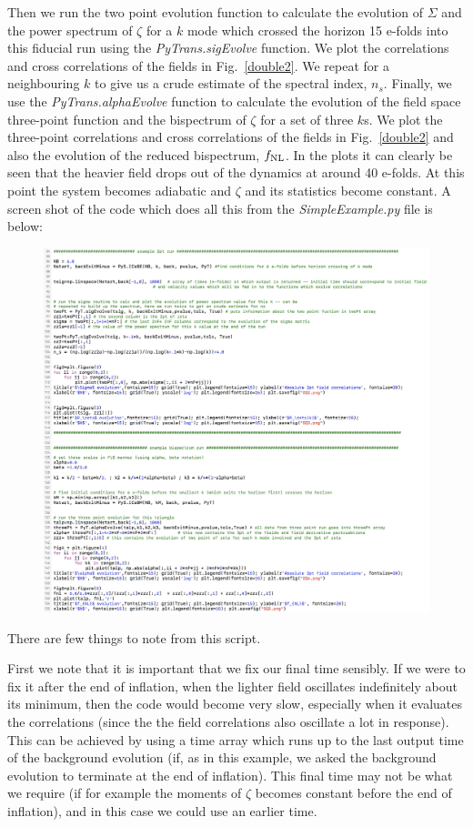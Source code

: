 \documentclass[10pt,
amsmath,amssymb,
aps,prd,nofootinbib,eqsecnum,a4paper]{revtex4}
\begin{document}
Then we run the two point evolution function to calculate the evolution 
of $\Sigma$ and the power spectrum of $\zeta$ for a $k$ mode which crossed the horizon 
15 e-folds into this fiducial run using the {\it PyTrans.sigEvolve} function. 
We plot the correlations and cross correlations of the fields in Fig.~\ref{double2}. 
We repeat for a neighbouring $k$ to give us a crude estimate of the spectral index,  $n_s$. 
Finally, we use the {\it PyTrans.alphaEvolve} function to calculate the evolution of the field space three-point function 
  and the bispectrum of $\zeta$  for a set of three $k$s.
We plot the three-point correlations and cross correlations of the fields in Fig.~\ref{double2} and also 
the evolution of the reduced 
bispectrum, $f_{\rm NL}$. In the plots it can clearly be 
seen that the heavier field drops out of the dynamics at around 40 e-folds. At this 
point the system becomes adiabatic and $\zeta$ and its statistics become constant.
A screen shot of the code which does all this from the {\it SimpleExample.py} file is below:
\begin{figure}[H]
\centering
\includegraphics[width=18cm]{Shot5b}
\end{figure}

\noindent There are few things to note from this script. 

First we note that  
it is important that we fix our final time sensibly. 
If we were to fix it after the end of inflation, when the lighter field 
oscillates indefinitely about its minimum, then the code would become very slow, especially 
when it evaluates the 
correlations (since the the field correlations also oscillate a lot in 
response). 
This can be achieved by using a time array which 
runs up to the last output time of the background evolution (if, as in this example, we asked the background evolution 
to terminate at the end 
of inflation).  This final time may not be what we require (if for example the moments of $\zeta$ becomes constant 
before the end of inflation), and in this case we could use an earlier time. 
\end{document}
